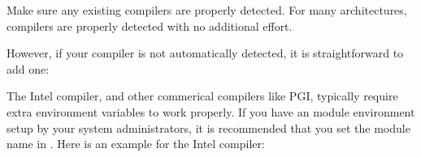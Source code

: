 \documentclass[letterpaper,10pt,english]{sphinxmanual}
\begin{document}
Make sure any existing compilers are properly detected. For many
architectures, compilers are properly detected with no additional
effort.

\begin{sphinxVerbatim}[commandchars=\\\{\}]
  
  
   
            
\end{sphinxVerbatim}

However, if your compiler is not automatically detected, it is straightforward
to add one:

\begin{sphinxVerbatim}[commandchars=\\\{\}]
    
\end{sphinxVerbatim}

The Intel compiler, and other commerical compilers like PGI, typically
require extra environment variables to work properly. If you have an
module environment set\sphinxhyphen{}up by your system administrators, it is
recommended that you set the module name in
. Here is an example for the
Intel compiler:
\end{document}
